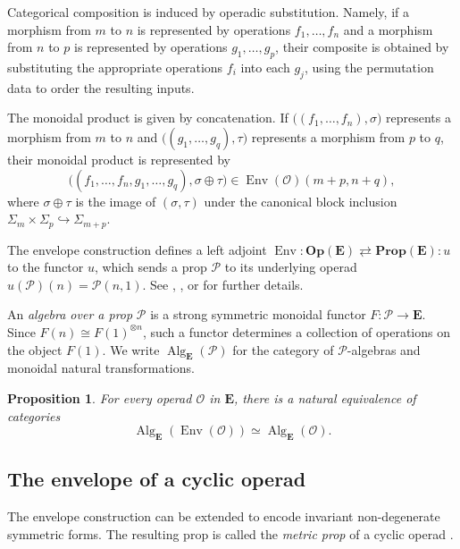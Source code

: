 \documentclass{amsart}
\newcommand{\bE}{\mathbf{E}}
\newcommand{\calO}{\mathcal{O}}
\newcommand{\calP}{\mathcal{P}}
\newcommand{\Op}{\mathbf{Op}}
\newcommand{\Prop}{\mathbf{Prop}}
\newcommand{\Alg}{\operatorname{Alg}}
\newcommand{\Env}{\operatorname{Env}}
\newtheorem{prop}[theorem]{Proposition}%
\theoremstyle{definition}
\numberwithin{equation}{section}
\begin{document}
Categorical composition is induced by operadic substitution. Namely, if a morphism from $m$ to $n$ is represented by operations
$f_1,\ldots,f_n$ and a morphism from $n$ to $p$ is represented by operations $g_1,\ldots,g_p$, their composite is obtained by substituting the appropriate operations $f_i$ into each $g_j$, using the permutation data to order the resulting inputs.

The monoidal product is given by concatenation. If $\bigl((f_1,\ldots,f_n),\sigma\bigr)$ represents a morphism from $m$ to $n$ and $\bigl((g_1,\ldots,g_q),\tau\bigr)$ represents a morphism from $p$ to $q$, their monoidal product is represented by
\[
\bigl((f_1,\ldots,f_n,g_1,\ldots,g_q),\sigma\oplus\tau\bigr)
\in\Env(\calO)(m+p,n+q),
\]
where $\sigma\oplus\tau$ is the image of $(\sigma,\tau)$ under the canonical block inclusion $\Sigma_m\times\Sigma_p\hookrightarrow\Sigma_{m+p}$.

The envelope construction defines a left adjoint $\Env\colon\Op(\bE)\rightleftarrows\Prop(\bE):u$ to the functor $u$, which sends a prop $\calP$ to its underlying operad $u(\calP)(n)=\calP(n,1)$. See \cite[Section~2.6.1]{hv_cyclic}, \cite[Proposition~11]{hr15}, or \cite{phillips2022operads} for further details.

An \emph{algebra over a prop} $\calP$ is a strong symmetric monoidal functor $F\colon\calP\to\bE$. Since $F(n)\cong F(1)^{\otimes n}$, such a functor determines a collection of operations on the object $F(1)$. We write $\Alg_{\bE}(\calP)$ for the category of $\calP$-algebras and monoidal natural transformations.

\begin{prop} \label{prop: algebras over operads and props are the same}
For every operad $\calO$ in $\bE$, there is a natural equivalence of categories
\[
\Alg_{\bE}(\Env(\calO))
\simeq
\Alg_{\bE}(\calO).
\]
\end{prop}

\subsection{The envelope of a cyclic operad}
\label{subsec: envelope of cyclic operad}

The envelope construction can be extended to encode invariant non-degenerate symmetric forms. The resulting prop is called the \emph{metric prop} of a cyclic operad \cite[Section~3.1.3]{hv_cyclic}.
\end{document}
